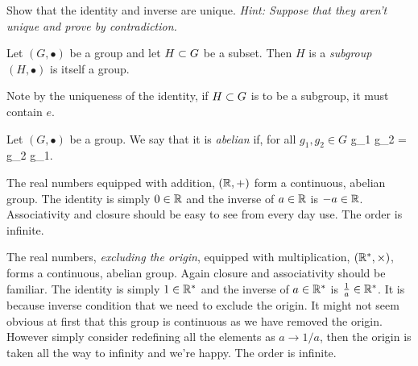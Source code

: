 \bbox 
    Show that the identity and inverse are unique. \textit{Hint: Suppose that they aren't unique and prove by contradiction.}
\ebox 

\bd[Subgroup]
    Let $(G,\bullet)$ be a group and let $H\ss G$ be a subset. Then $H$ is a \textit{subgroup} $(H,\bullet)$ is itself a group. 
\ed 

\br 
\label{rem:SubgroupNeedsIdentity}
    Note by the uniqueness of the identity, if $H\ss G$ is to be a subgroup, it must contain $e$.
\er 

    Let $(G,\bullet)$ be a group. We say that it is \textit{abelian} if, for all $g_1,g_2 \in G$ 
    \bse 
        g_1 \bullet g_2 = g_2 \bullet g_1.
    \ese 
\ed 

\bex 
    The real numbers equipped with addition, $(\R,+)$ form a continuous, abelian group. The identity is simply $0\in\R$ and the inverse of $a\in \R$ is $-a\in \R$. Associativity and closure should be easy to see from every day use. The order is infinite. 
\eex 

\bex
    The real numbers, \textit{excluding the origin}, equipped with multiplication, $(\R^*,\times)$, forms a continuous, abelian group. Again closure and associativity should be familiar. The identity is simply $1\in\R^*$ and the inverse of $a\in\R^*$ is $\frac{1}{a}\in\R^*$. It is because inverse condition that we need to exclude the origin. It might not seem obvious at first that this group is continuous as we have removed the origin. However simply consider redefining all the elements as $a \longrightarrow 1/a$, then the origin is taken all the way to infinity and we're happy. The order is infinite.
\eex 

